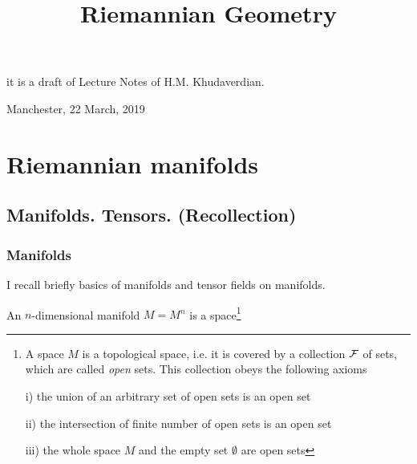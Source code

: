 \documentclass[12pt]{article}
\title{Riemannian Geometry}
\date{}
\theoremstyle{theorem}
\numberwithin{equation}{section}
\begin{document}
\maketitle

  \centerline {it is a draft of Lecture Notes of H.M. Khudaverdian.}

  \centerline { Manchester, 22  March,  2019}





\tableofcontents
{}
\newpage
{}




\section {Riemannian manifolds}


\subsection { Manifolds. Tensors. (Recollection)}

\subsubsection{Manifolds}



I recall briefly basics of manifolds 
and tensor fields on manifolds.

An $n$-dimensional manifold $M=M^n$ is a 
space\footnote
{A space $M$ is a topological space, i.e. it 
is covered by a collection $\cal F$ of sets,
which are called {\it open} sets.  This collection
obeys the following axioms

i) the union of an arbitrary set of open sets
is an open set

ii) the intersection of finite number of open sets
is an open set

iii) the whole space $M$ and the empty set 
$\emptyset$ are open sets
} 
\end{document}

